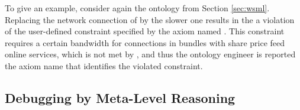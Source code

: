To give an example, consider again the ontology from Section
\ref{sec:wsml}. Replacing the network connection
 of  by the slower
 one results in the a violation of the
user-defined constraint specified by the axiom named
. This constraint
requires a certain bandwidth for connections in bundles with share
price feed online services, which is not met by
, and thus the ontology engineer is reported
the axiom name that identifies the violated constraint.


\subsection{Debugging by Meta-Level Reasoning}
